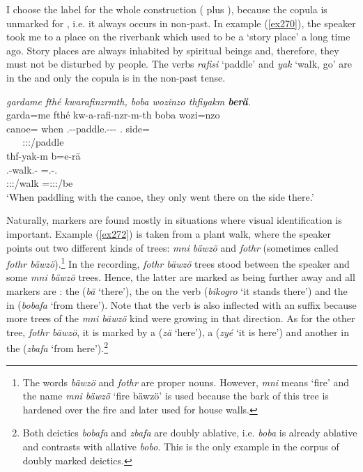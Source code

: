 I choose the label   for the whole construction (  plus ), because the copula is unmarked for , i.e. it always occurs in non-past. In example (\ref{ex270}), the speaker took me to a place on the riverbank which used to be a `story place' a long time ago. Story places are always inhabited by spiritual beings and, therefore, they must not be disturbed by people. The verbs \emph{rafisi} `paddle' and \emph{yak} `walk, go' are in the   and only the copula is in the non-past tense.

\begin{exe}
	\ex \emph{gardame fthé kwarafinzrmth, boba wozinzo thfiyakm \textbf{berä}.}\\
	\glll garda=me fthé kw-a-rafi-nzr-m-th boba wozi=nzo\\
	canoe={\Ins} when \M.\Betaone-\Vc-paddle.\Ext-\Ndu-\Dur-\Stnsg{} \Med.{\Abl} side={\Only}\\
	~ ~ {\footnotesize \Stpl:\Sbj:\Pst:\Dur/paddle} ~ ~\\
	\sn
	\glll thf-yak-m b=e-rä\\
	\Stnsg.\Betatwo-walk.\Ext-\Dur{} \Med=\Stnsg.\Alph-\Cop.\Ndu\\
	{\footnotesize \Stpl:\Sbj:\Pst:\Dur/walk} {\footnotesize \Med=\Stpl:\Sbj:\Nonpast:\Ipfv/be}\\
	\trans `When paddling with the canoe, they only went there on the side there.'\\ 
	\label{ex270}
\end{exe}

Naturally,  markers are found mostly in situations where visual identification is important. Example (\ref{ex272}) is taken from a plant walk, where the speaker points out two different kinds of trees: \emph{mni bäwzö} and \emph{fothr} (sometimes called \emph{fothr bäwzö}).\footnote{The words \emph{bäwzö} and \emph{fothr} are proper nouns. However, \emph{mni} means `fire' and the name \emph{mni bäwzö} `fire bäwzö' is used because the bark of this tree is hardened over the fire and later used for house walls.} In the recording, \emph{fothr bäwzö} trees stood between the speaker and some \emph{mni bäwzö} trees. Hence, the latter are marked as being further away and all  markers are : the  (\emph{bä} `there'), the  on the verb (\emph{bikogro} `it stands there') and the  in   (\emph{bobafa} `from there'). Note that the verb is also inflected with an  suffix because more trees of the \emph{mni bäwzö} kind were growing in that direction. As for the other tree, \emph{fothr bäwzö}, it is marked by a   (\emph{zä} `here'), a    (\emph{zyé} `it is here') and another   in the   (\emph{zbafa} `from here').\footnote{Both deictics \emph{bobafa} and \emph{zbafa} are doubly ablative, i.e. \emph{boba} is already ablative and contrasts with allative \emph{bobo}. This is the only example in the corpus of doubly marked deictics.}

